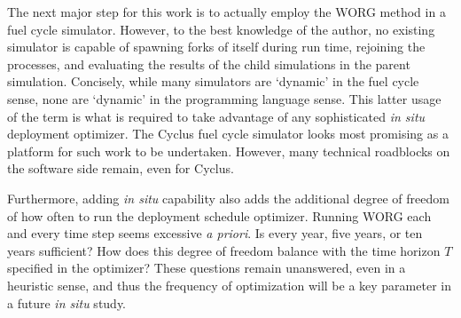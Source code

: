The next major step for this work is to actually employ the WORG method in
a fuel cycle simulator.  However, to the best knowledge of the
author, no existing simulator is capable of spawning forks of itself
during run time, rejoining the processes, and evaluating the results of the
child simulations in the parent simulation. Concisely, while many simulators
are
`dynamic' in the fuel cycle sense, none are `dynamic' in the programming
language sense. This latter usage of the term is what is required to
take advantage of any sophisticated \emph{in situ} deployment optimizer.
The Cyclus fuel cycle simulator looks most promising as a platform
for such work to be undertaken. However, many technical roadblocks
on the software side remain, even for Cyclus.

Furthermore, adding \emph{in situ} capability also adds the additional
degree of freedom of how often to run the deployment schedule optimizer.
Running WORG each and every
time step seems excessive \emph{a priori}. Is every year, five years,
or ten years sufficient? How does this degree of freedom balance with the
time horizon $T$ specified in the optimizer? These questions remain unanswered, even
in a heuristic sense, and thus the frequency of optimization will be a key
parameter in a future \emph{in situ} study.
